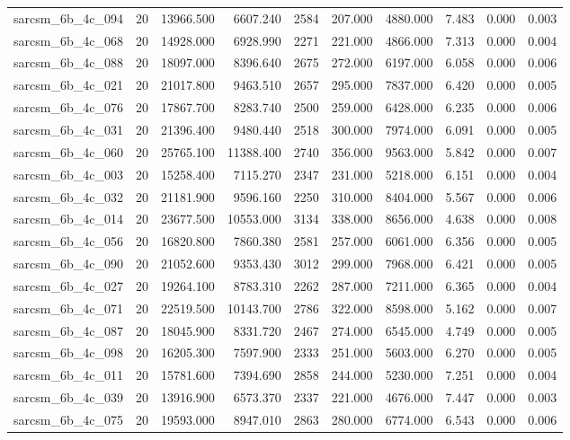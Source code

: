 \begin{tabular}{lrrrrrrrrr}
sarcsm\_6b\_4c\_094 & 20 & 13966.500 & 6607.240 & 2584 & 207.000 & 4880.000 & 7.483 & 0.000 & 0.003 \\
sarcsm\_6b\_4c\_068 & 20 & 14928.000 & 6928.990 & 2271 & 221.000 & 4866.000 & 7.313 & 0.000 & 0.004 \\
sarcsm\_6b\_4c\_088 & 20 & 18097.000 & 8396.640 & 2675 & 272.000 & 6197.000 & 6.058 & 0.000 & 0.006 \\
sarcsm\_6b\_4c\_021 & 20 & 21017.800 & 9463.510 & 2657 & 295.000 & 7837.000 & 6.420 & 0.000 & 0.005 \\
sarcsm\_6b\_4c\_076 & 20 & 17867.700 & 8283.740 & 2500 & 259.000 & 6428.000 & 6.235 & 0.000 & 0.006 \\
sarcsm\_6b\_4c\_031 & 20 & 21396.400 & 9480.440 & 2518 & 300.000 & 7974.000 & 6.091 & 0.000 & 0.005 \\
sarcsm\_6b\_4c\_060 & 20 & 25765.100 & 11388.400 & 2740 & 356.000 & 9563.000 & 5.842 & 0.000 & 0.007 \\
sarcsm\_6b\_4c\_003 & 20 & 15258.400 & 7115.270 & 2347 & 231.000 & 5218.000 & 6.151 & 0.000 & 0.004 \\
sarcsm\_6b\_4c\_032 & 20 & 21181.900 & 9596.160 & 2250 & 310.000 & 8404.000 & 5.567 & 0.000 & 0.006 \\
sarcsm\_6b\_4c\_014 & 20 & 23677.500 & 10553.000 & 3134 & 338.000 & 8656.000 & 4.638 & 0.000 & 0.008 \\
sarcsm\_6b\_4c\_056 & 20 & 16820.800 & 7860.380 & 2581 & 257.000 & 6061.000 & 6.356 & 0.000 & 0.005 \\
sarcsm\_6b\_4c\_090 & 20 & 21052.600 & 9353.430 & 3012 & 299.000 & 7968.000 & 6.421 & 0.000 & 0.005 \\
sarcsm\_6b\_4c\_027 & 20 & 19264.100 & 8783.310 & 2262 & 287.000 & 7211.000 & 6.365 & 0.000 & 0.004 \\
sarcsm\_6b\_4c\_071 & 20 & 22519.500 & 10143.700 & 2786 & 322.000 & 8598.000 & 5.162 & 0.000 & 0.007 \\
sarcsm\_6b\_4c\_087 & 20 & 18045.900 & 8331.720 & 2467 & 274.000 & 6545.000 & 4.749 & 0.000 & 0.005 \\
sarcsm\_6b\_4c\_098 & 20 & 16205.300 & 7597.900 & 2333 & 251.000 & 5603.000 & 6.270 & 0.000 & 0.005 \\
sarcsm\_6b\_4c\_011 & 20 & 15781.600 & 7394.690 & 2858 & 244.000 & 5230.000 & 7.251 & 0.000 & 0.004 \\
sarcsm\_6b\_4c\_039 & 20 & 13916.900 & 6573.370 & 2337 & 221.000 & 4676.000 & 7.447 & 0.000 & 0.003 \\
sarcsm\_6b\_4c\_075 & 20 & 19593.000 & 8947.010 & 2863 & 280.000 & 6774.000 & 6.543 & 0.000 & 0.006 \\

\end{tabular}
